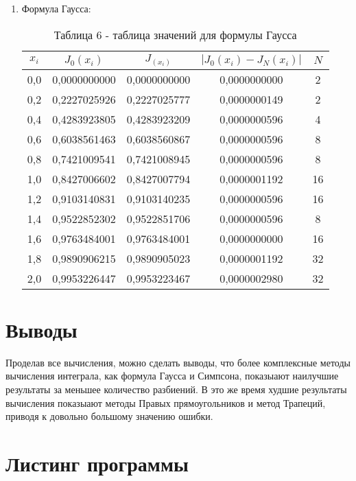 \documentclass[14pt]{article}
\begin{document}
\begin{enumerate}[label = \arabic*.]
\begin{enumerate}
{            }
        \end{enumerate}
    \item {Формула Гаусса:
        \begin{table}[h]
          \centering
          \begin{tabular}{|c|c|c|c|c|}
            \hline
            $x_i$ & $J_0(x_i)$ & $J_(x_i)$ & $\left|J_0(x_i) - J_N(x_i)\right|$ & $N$\\
            \hline
            0,0 & 0,0000000000 & 0,0000000000 & 0,0000000000 & 2\\
            \hline
            0,2 & 0,2227025926 & 0,2227025777 & 0,0000000149 & 2\\
            \hline
            0,4 & 0,4283923805 & 0,4283923209 & 0,0000000596 & 4\\
            \hline
            0,6 & 0,6038561463 & 0,6038560867 & 0,0000000596 & 8\\
            \hline
            0,8 & 0,7421009541 & 0,7421008945 & 0,0000000596 & 8\\
            \hline
            1,0 & 0,8427006602 & 0,8427007794 & 0,0000001192 & 16\\
            \hline
            1,2 & 0,9103140831 & 0,9103140235 & 0,0000000596 & 16\\
            \hline
            1,4 & 0,9522852302 & 0,9522851706 & 0,0000000596 & 8\\
            \hline
            1,6 & 0,9763484001 & 0,9763484001 & 0,0000000000 & 16\\
            \hline
            1,8 & 0,9890906215 & 0,9890905023 & 0,0000001192 & 32\\
            \hline
            2,0 & 0,9953226447 & 0,9953223467 & 0,0000002980 & 32\\
            \hline
          \end{tabular}
          \caption*{\small{Таблица 6 - таблица значений для формулы Гаусса}}
        \end{table}
    }
\end{enumerate}
\section{Выводы}
\hspace{5mm}Проделав все вычисления, можно сделать выводы, что более комплексные методы вычисления интеграла, как формула Гаусса и Симпсона, показыают наилучшие результаты за меньшее количество разбиений. В это же время худшие результаты вычисления показыают методы Правых прямоугольников и метод Трапеций, приводя к довольно большому значению ошибки.
\section{Листинг программы}

\end{document}
